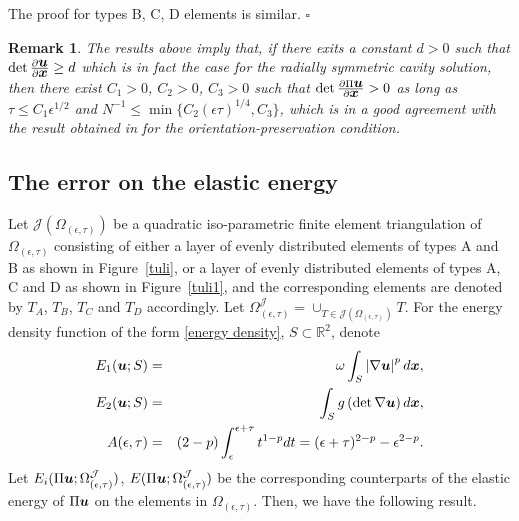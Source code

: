 \documentclass[12pt]{article}
\renewcommand{\vec}[1]{\mbox{\boldmath$#1$}}
\newtheorem{remark}[theorem]{Remark}
\numberwithin{equation}{section}
\begin{document}
The proof for types B, C, D elements is similar.
\hfill $\square$

\begin{remark}\label{rm-orientation}
The results above imply that, if there exits a constant $d>0$ such that
$\det \frac{\partial \vec{u}}{\partial \vec{x}}\ge d$ which is in fact the case for the
radially symmetric cavity solution, then there exist $C_1>0$,
$C_2>0$, $C_3>0$ such that $\det \frac{\partial \Pi \vec{u}}{\partial \vec{x}}>0$
as long as $\tau\le C_1\epsilon^{1/2}$ and $N^{-1}\le \min\{C_2(\epsilon \tau)^{1/4}, C_3\}$,
which is in a good agreement with the result obtained in \cite{detp} for the
orientation-preservation condition.
\end{remark}

\subsection{The error on the elastic energy}

Let $\mathcal{J}(\Omega_{(\epsilon,\tau)})$ be a quadratic iso-parametric
finite element triangulation of $\Omega_{(\epsilon,\tau)}$ consisting of either a
layer of evenly distributed elements of types A and B as shown in Figure~\ref{tuli},
or a layer of evenly distributed elements of types A, C and D as shown in
Figure~\ref{tuli1}, and the corresponding elements are denoted by $T_A$, $T_B$,
$T_C$ and $T_D$ accordingly. Let $\Omega^{\mathcal{J}}_{(\epsilon,\tau)} = \cup_{T \in
\mathcal{J}(\Omega_{(\epsilon,\tau)})} T$. For the energy density function of the
form \eqref{energy density}, $S\subset \mathbb{R}^2$, denote
\begin{eqnarray}
E_1(\vec{u};S) &=& \omega \int_S \left| \nabla \vec{u}\right|^p d \vec{x}, \label{E1}\\
E_2(\vec{u};S) &=& \int_S g\left(\det \nabla \vec{u} \right) d \vec{x}, \label{E2}\\
A(\epsilon,\tau)&=&(2-p)\int_\epsilon^{\epsilon+\tau}t^{1-p}
dt=(\epsilon+\tau)^{2-p}-\epsilon^{2-p}.\label{A}
\end{eqnarray}
Let $E_i(\Pi \vec{u};\Omega^{\mathcal{J}}_{(\epsilon,\tau)})$,
$E(\Pi \vec{u};\Omega^{\mathcal{J}}_{(\epsilon,\tau)})$ be the corresponding counterparts
of the elastic energy of $\Pi \vec{u}$ on the elements in $\Omega_{(\epsilon,\tau)}$.
Then, we have the following result.
\end{document}
